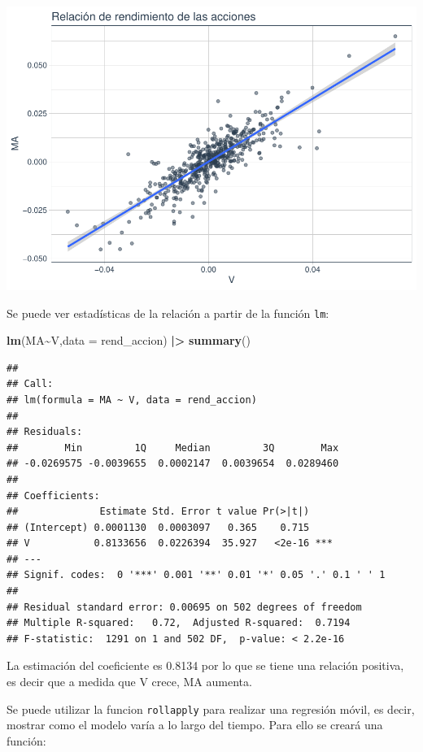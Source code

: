 \documentclass[
]{book}
\newenvironment{Shaded}{\begin{snugshade}}{\end{snugshade}}
\newcommand{\AttributeTok}[1]{\textcolor[rgb]{0.13,0.29,0.53}{#1}}
\newcommand{\FunctionTok}[1]{\textcolor[rgb]{0.13,0.29,0.53}{\textbf{#1}}}
\newcommand{\NormalTok}[1]{#1}
\newcommand{\SpecialCharTok}[1]{\textcolor[rgb]{0.81,0.36,0.00}{\textbf{#1}}}
\begin{document}
\includegraphics{Libro_TidyQualityTools_files/figure-latex/unnamed-chunk-71-1.pdf}

Se puede ver estadísticas de la relación a partir de la función \texttt{lm}:

\begin{Shaded}
\begin{Highlighting}[]
\FunctionTok{lm}\NormalTok{(MA}\SpecialCharTok{\textasciitilde{}}\NormalTok{V,}\AttributeTok{data =}\NormalTok{ rend\_accion) }\SpecialCharTok{|\textgreater{}} \FunctionTok{summary}\NormalTok{()}
\end{Highlighting}
\end{Shaded}

\begin{verbatim}
## 
## Call:
## lm(formula = MA ~ V, data = rend_accion)
## 
## Residuals:
##        Min         1Q     Median         3Q        Max 
## -0.0269575 -0.0039655  0.0002147  0.0039654  0.0289460 
## 
## Coefficients:
##              Estimate Std. Error t value Pr(>|t|)    
## (Intercept) 0.0001130  0.0003097   0.365    0.715    
## V           0.8133656  0.0226394  35.927   <2e-16 ***
## ---
## Signif. codes:  0 '***' 0.001 '**' 0.01 '*' 0.05 '.' 0.1 ' ' 1
## 
## Residual standard error: 0.00695 on 502 degrees of freedom
## Multiple R-squared:   0.72,  Adjusted R-squared:  0.7194 
## F-statistic:  1291 on 1 and 502 DF,  p-value: < 2.2e-16
\end{verbatim}

La estimación del coeficiente es 0.8134 por lo que se tiene una relación positiva, es decir que a medida que V crece, MA aumenta.

Se puede utilizar la funcion \texttt{rollapply} para realizar una regresión móvil, es decir, mostrar como el modelo varía a lo largo del tiempo. Para ello se creará una función:
\end{document}
